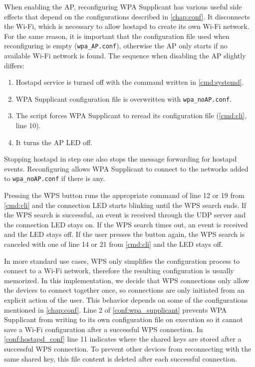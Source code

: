 \documentclass[a4paper,11pt,oneside]{report}
\begin{document}
When enabling the AP, reconfiguring WPA Supplicant has various useful side effects that depend on the configurations described in \autoref{chap:conf}. It disconnects the Wi-Fi, which is necessary to allow hostapd to create its own Wi-Fi network. For the same reason, it is important that the configuration file used when reconfiguring is empty (\verb|wpa_AP.conf|), otherwise the AP only starts if no available Wi-Fi network is found. The sequence when disabling the AP slightly differs:
\begin{enumerate}
  \item Hostapd service is turned off with the command written in \autoref{cmd:systemd}.
  \item WPA Supplicant configuration file is overwritten with \verb|wpa_noAP.conf|.
  \item The script forces WPA Supplicant to reread its configuration file (\autoref{cmd:cli}, line 10).
  \item It turns the AP LED off.
\end{enumerate}

Stopping hostapd in step one also stops the message forwarding for hostapd events. Reconfiguring allows WPA Supplicant to connect to the networks added to \verb|wpa_noAP.conf| if there is any.

Pressing the WPS button runs the appropriate command of line 12 or 19 from \autoref{cmd:cli} and the connection LED starts blinking until the WPS search ends. If the WPS search is successful, an event is received through the UDP server and the connection LED stays on. If the WPS search times out, an event is received and the LED stays off. If the user presses the button again, the WPS search is canceled with one of line 14 or 21 from \autoref{cmd:cli} and the LED stays off.

In more standard use cases, WPS only simplifies the configuration process to connect to a Wi-Fi network, therefore the resulting configuration is usually memorized. In this implementation, we decide that WPS connections only allow the devices to connect together once, so connections are only initiated from an explicit action of the user. This behavior depends on some of the configurations mentioned in \autoref{chap:conf}. Line 2 of \autoref{conf:wpa_supplicant} prevents WPA Supplicant from writing to its own configuration file on execution so it cannot save a Wi-Fi configuration after a successful WPS connection. In \autoref{conf:hostapd_conf} line 11 indicates where the shared keys are stored after a successful WPS connection. To prevent other devices from reconnecting with the same shared key, this file content is deleted after each successful connection.
\end{document}
